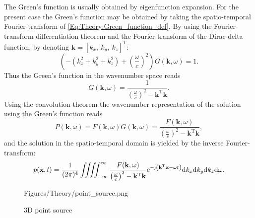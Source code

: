 The Green's function is usually obtained by eigenfunction expansion. For the present case the Green's function may be obtained by taking the spatio-temporal Fourier-transform of \eqref{Eq:Theory:Green_function_def}. By using the Fourier-transform differentiation theorem and the Fourier-transform of the Dirac-delta function, by denoting $\mathbf{k} = [k_x,\ k_y,\ k_z]^{\mathrm{T}}$:
\begin{equation}
(-(k_x^2 + k_y^2 + k_z^2) + \left(\frac{\omega}{c} \right)^2)G(\mathbf{k},\omega) = 1.
\end{equation}
Thus the Green's function in the wavenumber space reads
\begin{equation}
G(\mathbf{k},\omega) = \frac{1}{\left( \frac{\omega}{c}\right)^2 - \mathbf{k}^{\mathrm{T}} \mathbf{k}}.
\label{Eq:Theory:3D_kxkykzw_Green}
\end{equation}
Using the convolution theorem the wavenumber representation of the solution using the Green's function reads
\begin{equation}
P(\mathbf{k},\omega)  = F(\mathbf{k},\omega) G(\mathbf{k},\omega) =\frac{F(\mathbf{k},\omega)}{\left( \frac{\omega}{c}\right)^2 -  \mathbf{k}^{\mathrm{T}} \mathbf{k} },
\end{equation}
and the solution in the spatio-temporal domain is yielded by the inverse Fourier-transform:
\begin{equation}
p(\mathbf{x},t) =\frac{1}{(2\pi)^4} \iiiint^{\infty}_{-\infty} \frac{F(\mathbf{k},\omega)}{\left( \frac{\omega}{c}\right)^2 -  \mathbf{k}^{\mathrm{T}} \mathbf{k} } \mathrm{e}^{-\mathrm{j} \left( \mathbf{k}^{\mathrm{T}}\mathbf{x} - \omega t \right) } \mathrm{d} k_x \mathrm{d} k_y \mathrm{d} k_z \mathrm{d} \omega.
\end{equation}

\begin{figure}
	\centering
	\begin{overpic}[width = 1\columnwidth]{Figures/Theory/point_source.png}
	\end{overpic}
	\caption{3D point source}
	\label{Fig:Theory:point_source}
\end{figure}

